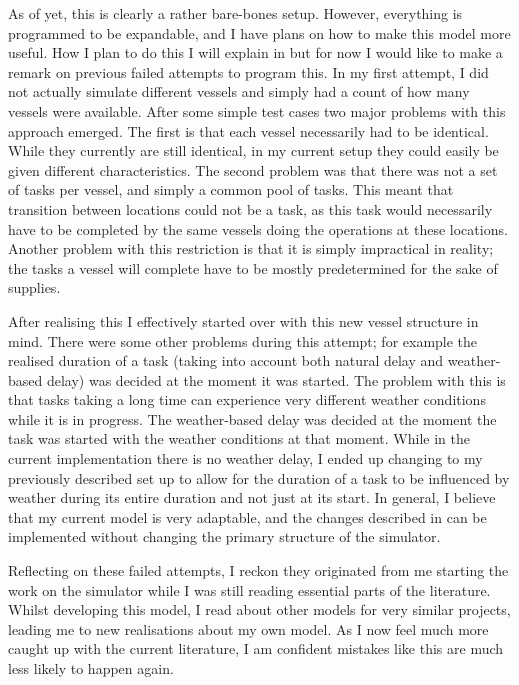 \documentclass[a4paper,12pt]{article}
\begin{document}
\bigskip

As of yet, this is clearly a rather bare-bones setup. However, everything is programmed to be expandable, and I have plans on how to make this model more useful. How I plan to do this I will explain in  but for now I would like to make a remark on previous failed attempts to program this. In my first attempt, I did not actually simulate different vessels and simply had a count of how many vessels were available. After some simple test cases two major problems with this approach emerged. The first is that each vessel necessarily had to be identical. While they currently are still identical, in my current setup they could easily be given different characteristics. The second problem was that there was not a set of tasks per vessel, and simply a common pool of tasks. This meant that transition between locations could not be a task, as this task would necessarily have to be completed by the same vessels doing the operations at these locations. Another problem with this restriction is that it is simply impractical in reality; the tasks a vessel will complete have to be mostly predetermined for the sake of supplies.

After realising this I effectively started over with this new vessel structure in mind. There were some other problems during this attempt; for example the realised duration of a task (taking into account both natural delay and weather-based delay) was decided at the moment it was started. The problem with this is that tasks taking a long time can experience very different weather conditions while it is in progress. The weather-based delay was decided at the moment the task was started with the weather conditions at that moment. While in the current implementation there is no weather delay, I ended up changing to my previously described set up to allow for the duration of a task to be influenced by weather during its entire duration and not just at its start. In general, I believe that my current model is very adaptable, and the changes described in  can be implemented without changing the primary structure of the simulator. 

Reflecting on these failed attempts, I reckon they originated from me starting the work on the simulator while I was still reading essential parts of the literature. Whilst developing this model, I read about other models for very similar projects, leading me to new realisations about my own model. As I now feel much more caught up with the current literature, I am confident mistakes like this are much less likely to happen again. 
\end{document}
